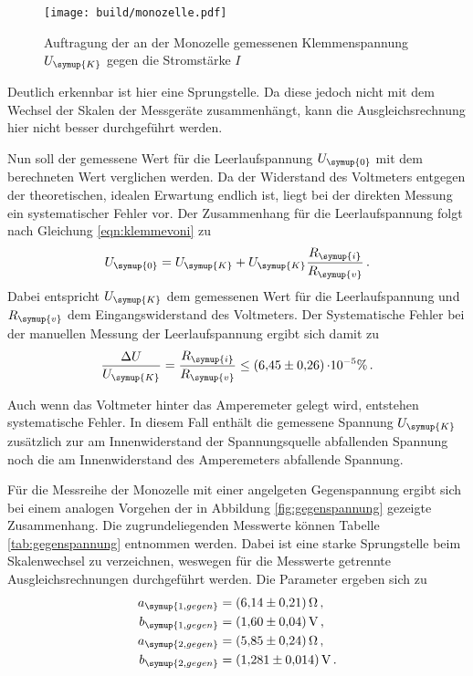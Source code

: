 \begin{figure}
  \centering
  \texttt{[image: build/monozelle.pdf]}
  \caption{Auftragung der an der Monozelle gemessenen Klemmenspannung $U_{\symup{K}}$
  gegen die Stromstärke $I$}
  \label{fig:monozelle}
\end{figure}

Deutlich erkennbar ist hier eine Sprungstelle. Da diese jedoch nicht mit dem Wechsel
der Skalen der Messgeräte zusammenhängt, kann die Ausgleichsrechnung hier nicht besser durchgeführt
werden.

Nun soll der gemessene Wert für die Leerlaufspannung $U_{\symup{0}}$ mit dem
berechneten Wert verglichen werden. Da der Widerstand des Voltmeters entgegen
der theoretischen, idealen Erwartung endlich ist, liegt bei der direkten Messung
ein systematischer Fehler vor. Der Zusammenhang für die Leerlaufspannung folgt
nach Gleichung \eqref{eqn:klemmevoni} zu
\begin{equation}
  U_{\symup{0}}=U_{\symup{K}}+U_{\symup{K}}\frac{R_{\symup{i}}}{R_{\symup{v}}}\,.
\end{equation}
Dabei entspricht $U_{\symup{K}}$ dem gemessenen Wert für die Leerlaufspannung
und $R_{\symup{v}}$ dem Eingangswiderstand des Voltmeters.
Der Systematische Fehler bei der manuellen Messung der Leerlaufspannung ergibt
sich damit zu
\begin{equation}
  \frac{\Delta U}{U_{\symup{K}}}=\frac{R_{\symup{i}}}{R_{\symup{v}}} \leq \SI{6.45(026)}\cdot10^{-5}\%\,. \nonumber
\end{equation}

Auch wenn das Voltmeter hinter das Amperemeter gelegt wird, entstehen systematische
Fehler. In diesem Fall enthält die gemessene Spannung $U_{\symup{K}}$ zusätzlich
zur am Innenwiderstand der Spannungsquelle abfallenden Spannung noch die am Innenwiderstand
des Amperemeters abfallende Spannung.

Für die Messreihe der Monozelle mit einer angelgeten Gegenspannung ergibt sich
bei einem analogen Vorgehen der in Abbildung \ref{fig:gegenspannung} gezeigte Zusammenhang.
Die zugrundeliegenden Messwerte können Tabelle \ref{tab:gegenspannung} entnommen werden.
Dabei ist eine starke Sprungstelle beim Skalenwechsel zu verzeichnen, weswegen für
die Messwerte getrennte Ausgleichsrechnungen durchgeführt werden. Die Parameter ergeben sich zu
\begin{align*}
  a_{\symup{1,gegen}} &= \SI{6.14(021)}{\ohm}\,,\\
  b_{\symup{1,gegen}} &= \SI{1.60(004)}{\volt}\,,\\
  a_{\symup{2,gegen}} &= \SI{5.85(024)}{\ohm}\,,\\
  b_{\symup{2,gegen}} &= \SI{1.281(0014)}{\volt}\,.
\end{align*}

